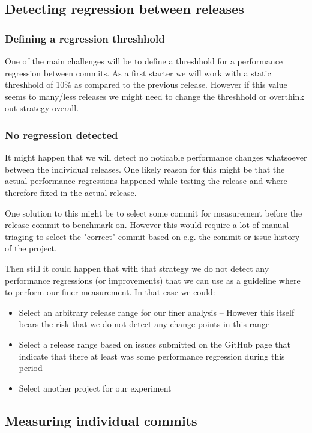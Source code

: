 \documentclass[	runningheads,
				a4paper]{llncs}
\begin{document}
\subsection{Detecting regression between releases}
\subsubsection{Defining a regression threshhold}
One of the main challenges will be to define a threshhold for a performance regression between commits. As a first starter we will work with a static threshhold of 10\% as compared to the previous release. However if this value seems to many/less releases we might need to change the threshhold or overthink out strategy overall.

\subsubsection{No regression detected}
It might happen that we will detect no noticable performance changes whatsoever between the individual releases. One likely reason for this might be that the actual performance regressions happened while testing the release and where therefore fixed in the actual release.

One solution to this might be to select some commit for measurement before the release commit to benchmark on. However this would require a lot of manual triaging to select the "correct" commit based on e.g. the commit or issue history of the project.

Then still it could happen that with that strategy we do not detect any performance regressions (or improvements) that we can use as a guideline where to perform our finer measurement. In that case we could:
\begin{itemize}
	\item Select an arbitrary release range for our finer analysis -- However this itself bears the risk that we do not detect any change points in this range
	\item Select a release range based on issues submitted on the GitHub page that indicate that there at least was some performance regression during this period
	\item Select another project for our experiment
\end{itemize}

\subsection{Measuring individual commits}
\end{document}
